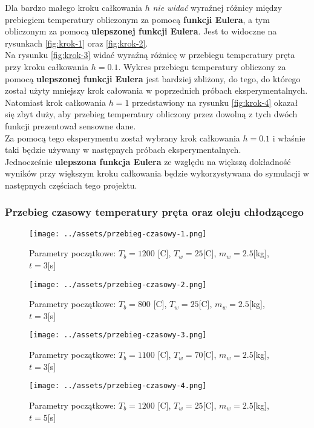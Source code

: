 \documentclass[
	12pt, %
]{fphw}
\begin{document}
Dla bardzo małego kroku całkowania \(h\) \textit{nie widać} wyraźnej różnicy między prebiegiem temperatury
obliczonym za pomocą \textbf{funkcji Eulera}, a tym obliczonym za pomocą \textbf{ulepszonej funkcji Eulera}.
Jest to widoczne na rysunkach \ref{fig:krok-1} oraz \ref{fig:krok-2}.\\
Na rysunku \ref{fig:krok-3} widać wyraźną różnicę w przebiegu temperatury pręta przy kroku całkowania \(h = 0.1\).
Wykres przebiegu temperatury obliczony za pomocą \textbf{ulepszonej funkcji Eulera} jest bardziej zbliżony,
do tego, do którego został użyty mniejszy krok całowania w poprzednich próbach eksperymentalnych. \\
Natomiast krok całkowania \(h = 1\) przedstawiony na rysunku \ref{fig:krok-4} okazał się zbyt duży,
aby przebieg temperatury obliczony przez dowolną z tych dwóch funkcji prezentował sensowne dane. \\
Za pomocą tego eksperymentu został wybrany krok całkowania \(h = 0.1\) i właśnie taki będzie używany
w następnych próbach eksperymentalnych. \\
Jednocześnie \textbf{ulepszona funkcja Eulera} ze względu na większą dokładność wyników przy większym kroku całkowania
będzie wykorzystywana do symulacji w następnych częściach tego projektu.

\subsubsection{Przebieg czasowy temperatury pręta oraz oleju chłodzącego}

\begin{figure}[H]
	\texttt{[image: ../assets/przebieg-czasowy-1.png]}
	\caption{Parametry początkowe: \(T_b = 1200\) [\textdegree{}C], \(T_w = 25\)[\textdegree{}C], \(m_w = 2.5\)[kg], \(t = 3\)[s]}

	\texttt{[image: ../assets/przebieg-czasowy-2.png]}
	\caption{Parametry początkowe: \(T_b = 800\) [\textdegree{}C], \(T_w = 25\)[\textdegree{}C], \(m_w = 2.5\)[kg], \(t = 3\)[s]}
\end{figure}


\begin{figure}[H]
	\texttt{[image: ../assets/przebieg-czasowy-3.png]}
	\caption{Parametry początkowe: \(T_b = 1100\) [\textdegree{}C], \(T_w = 70\)[\textdegree{}C], \(m_w = 2.5\)[kg], \(t = 3\)[s]}

	\texttt{[image: ../assets/przebieg-czasowy-4.png]}
	\caption{Parametry początkowe: \(T_b = 1200\) [\textdegree{}C], \(T_w = 25\)[\textdegree{}C], \(m_w = 2.5\)[kg], \(t = 5\)[s]}
\end{figure}
\end{document}
